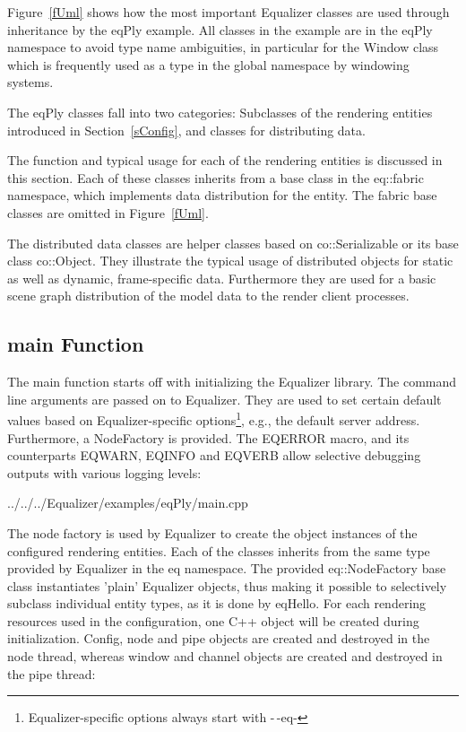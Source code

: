 \documentclass[10pt,a4]{scrartcl}
\newcommand{\fig}[1]{Figure~\ref{#1}}
\newcommand{\sref}[1]{Section~\ref{#1}}
\begin{document}
\fig{fUml} shows how the most important Equalizer classes are used through
inheritance by the \textsf{eqPly} example. All classes in the example are in the
\textsf{eqPly} namespace to avoid type name ambiguities, in particular for the
\textsf{Window} class which is frequently used as a type in the global namespace
by windowing systems.

The \textsf{eqPly} classes fall into two categories: Subclasses of the
rendering entities introduced in \sref{sConfig}, and classes for
distributing data.

The function and typical usage for each of the rendering entities is discussed
in this section. Each of these classes inherits from a base class in the
\textsf{eq::fabric} name\-space, which implements data distribution for the
entity. The fabric base classes are omitted in \fig{fUml}.

The distributed data classes are helper classes based on
\textsf{co::Serializable} or its base class \textsf{co::Object}. They illustrate
the typical usage of distributed objects for static as well as dynamic,
frame-specific data. Furthermore they are used for a basic scene graph
distribution of the model data to the render client processes.


\subsection{main Function}

The main function starts off with initializing the Equalizer library. The
command line arguments are passed on to Equalizer. They are used to set certain
default values based on Equalizer-specific options\footnote{Equalizer-specific
  options always start with -\,-eq-}, e.g., the default server
address. Furthermore, a \textsf{NodeFactory} is provided. The \textsf{EQERROR}
macro, and its counterparts \textsf{EQWARN}, \textsf{EQINFO} and \textsf{EQVERB}
allow selective debugging outputs with various logging levels:

{\footnotesize
  {../../../Equalizer/examples/eqPly/main.cpp}}

The node factory is used by Equalizer to create the object instances of
the configured rendering entities. Each of the classes inherits from the
same type provided by Equalizer in the \textsf{eq} namespace. The
provided \textsf{eq::NodeFactory} base class instantiates 'plain'
Equalizer objects, thus making it possible to selectively subclass
individual entity types, as it is done by \textsf{eqHello}. For each
rendering resources used in the configuration, one C++ object will be
created during initialization. Config, node and pipe objects are created and
destroyed in the node thread, whereas window and channel objects are
created and destroyed in the pipe thread:
\end{document}
